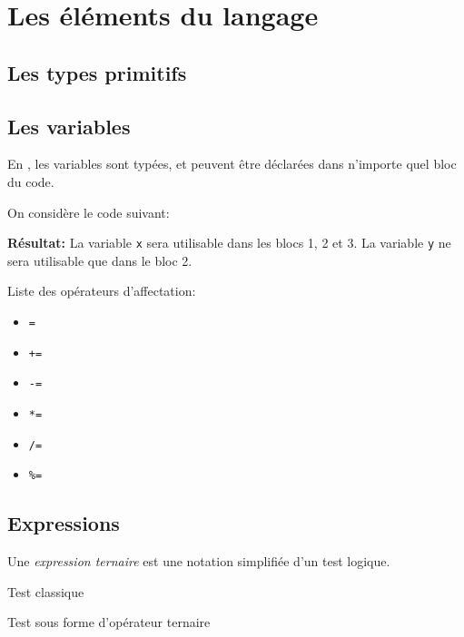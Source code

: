 \chapter{Les éléments du langage}
		\section{Les types primitifs}
		
			
		
		\section{Les variables}
		
			En \lang, les variables sont typées, et peuvent être déclarées dans n'importe quel bloc du code.
			\begin{exemple}
				On considère le code suivant:
				
			\end{exemple}
			\textbf{Résultat:} La variable \lstinline|x| sera utilisable dans les blocs 1, 2 et 3.
			La variable \lstinline|y| ne sera utilisable que dans le bloc 2.
			
			Liste des opérateurs d'affectation:
			\begin{itemize}
				\item \lstinline|=|
				\item \lstinline|+=|
				\item \lstinline|-=|
				\item \lstinline|*=|
				\item \lstinline|/=|
				\item \lstinline|%=|
			\end{itemize}
		
		\section{Expressions}
		
			\begin{definition}
				Une \emph{expression ternaire} est une notation \og simplifiée\fg{} d'un test logique.
			\end{definition}
			\begin{exemple}
				Test classique
				
			\end{exemple}
			\begin{exemple}
				Test sous forme d'opérateur ternaire
				
			\end{exemple}
		

